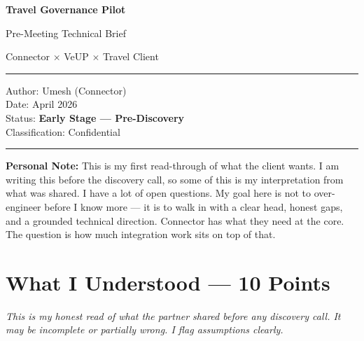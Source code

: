 \documentclass[11pt, a4paper]{article}
\begin{document}
\begin{titlepage}
  \centering
  \vspace*{2cm}
  {\Large\bfseries\color{connectorblue} Travel Governance Pilot\par}
  \vspace{0.5cm}
  {\large Pre-Meeting Technical Brief\par}
  \vspace{0.3cm}
  {\normalsize\color{darkgray} Connector $\times$ VeUP $\times$ Travel Client\par}
  \vspace{1cm}
  \hrule
  \vspace{0.5cm}
  {\small\color{darkgray}
    Author: Umesh (Connector) \\
    Date: April 2026 \\
    Status: \textbf{Early Stage --- Pre-Discovery} \\
    Classification: Confidential
  }
  \vspace{1cm}
  \hrule
  \vspace{1.5cm}

  \begin{notebox}
    \textbf{Personal Note:} This is my first read-through of what the client wants.
    I am writing this before the discovery call, so some of this is my interpretation
    from what was shared. I have a lot of open questions. My goal here is not to
    over-engineer before I know more --- it is to walk in with a clear head,
    honest gaps, and a grounded technical direction. Connector has what they need
    at the core. The question is how much integration work sits on top of that.
  \end{notebox}

\end{titlepage}

\section{What I Understood --- 10 Points}

\begin{notebox}
\textit{This is my honest read of what the partner shared before any discovery call. It may be incomplete or partially wrong. I flag assumptions clearly.}
\end{notebox}

\vspace{0.5em}
\end{document}

